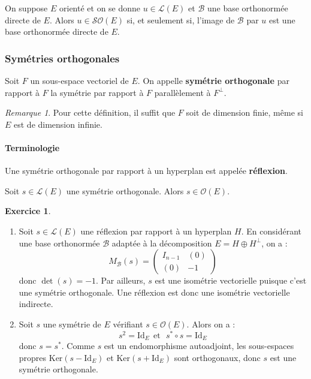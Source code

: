 \documentclass[french]{article}
\newcommand{\st}{^*}
\renewcommand{\ker}{\text{Ker}}
\theoremstyle{plain}
\theoremstyle{definition}
\newtheorem{exo}{Exercice}
\theoremstyle{remark}
\newtheorem*{rmq}{Remarque}
\begin{document}
\begin{thm}
	On suppose $E$ orienté et on se donne $u\in\mathcal{L}(E)$ et $\mathcal{B}$ une base orthonormée directe de $E$. Alors $u\in\mathcal{SO}(E)$ si, et seulement si, l'image de $\mathcal{B}$ par $u$ est une base orthonormée directe de $E$.
\end{thm}

\subsubsection*{Symétries orthogonales}

\begin{dfn}
	Soit $F$ un sous-espace vectoriel de $E$. On appelle \textbf{symétrie orthogonale} par rapport à $F$ la symétrie par rapport à $F$ parallèlement à $F^\bot$.
\end{dfn}

\begin{rmq}
	Pour cette définition, il suffit que $F$ soit de dimension finie, même si $E$ est de dimension infinie.
\end{rmq}

\paragraph{Terminologie} Une symétrie orthogonale par rapport à un hyperplan est appelée \textbf{réflexion}.

\begin{thm}{}
	Soit $s\in\mathcal{L}(E)$ une symétrie orthogonale. Alors $s\in\mathcal{O}(E)$.
\end{thm}

\begin{exo}
	\begin{enumerate}
		\item Soit $s\in\mathcal{L}(E)$ une réflexion par rapport à un hyperplan $H$. En considérant une base orthonormée $\mathcal{B}$ adaptée à la décomposition $E=H\oplus H^\bot$, on a : $$M_\mathcal{B}(s)=\begin{pmatrix}
			I_{n-1}&(0)\\
			(0)&-1
		\end{pmatrix}$$ donc $\det(s)=-1$. Par ailleurs, $s$ est une isométrie vectorielle puisque c'est une symétrie orthogonale. Une réflexion est donc une isométrie vectorielle indirecte.
		\item Soit $s$ une symétrie de $E$ vérifiant $s\in\mathcal{O}(E)$. Alors on a : $$s^2=\text{Id}_E\ \ \text{et}\ \ \ s\st\circ s=\text{Id}_E$$ donc $s=s\st$. Comme $s$ est un endomorphisme autoadjoint, les sous-espaces propres $\ker(s-\text{Id}_E)$ et $\ker(s+\text{Id}_E)$ sont orthogonaux, donc $s$ est une symétrie orthogonale.
	\end{enumerate}
\end{exo}
\end{document}
